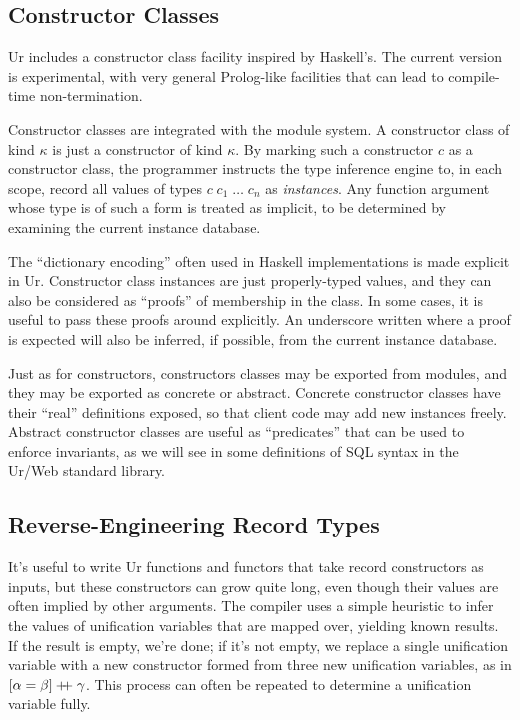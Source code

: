 \documentclass{article}
\newcommand{\rc}{+ \hspace{-.075in} + \;}
\begin{document}
\subsection{\label{typeclasses}Constructor Classes}

Ur includes a constructor class facility inspired by Haskell's.  The current version is experimental, with very general Prolog-like facilities that can lead to compile-time non-termination.

Constructor classes are integrated with the module system.  A constructor class of kind $\kappa$ is just a constructor of kind $\kappa$.  By marking such a constructor $c$ as a constructor class, the programmer instructs the type inference engine to, in each scope, record all values of types $c \; c_1 \; \ldots \; c_n$ as \emph{instances}.  Any function argument whose type is of such a form is treated as implicit, to be determined by examining the current instance database.

The ``dictionary encoding'' often used in Haskell implementations is made explicit in Ur.  Constructor class instances are just properly-typed values, and they can also be considered as ``proofs'' of membership in the class.  In some cases, it is useful to pass these proofs around explicitly.  An underscore written where a proof is expected will also be inferred, if possible, from the current instance database.

Just as for constructors, constructors classes may be exported from modules, and they may be exported as concrete or abstract.  Concrete constructor classes have their ``real'' definitions exposed, so that client code may add new instances freely.  Abstract constructor classes are useful as ``predicates'' that can be used to enforce invariants, as we will see in some definitions of SQL syntax in the Ur/Web standard library.

\subsection{Reverse-Engineering Record Types}

It's useful to write Ur functions and functors that take record constructors as inputs, but these constructors can grow quite long, even though their values are often implied by other arguments.  The compiler uses a simple heuristic to infer the values of unification variables that are mapped over, yielding known results.  If the result is empty, we're done; if it's not empty, we replace a single unification variable with a new constructor formed from three new unification variables, as in $[\alpha = \beta] \rc \gamma$.  This process can often be repeated to determine a unification variable fully.
\end{document}
